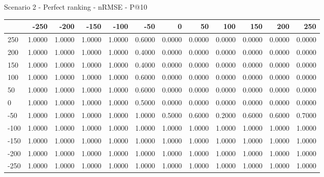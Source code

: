Scenario 2 - Perfect ranking - nRMSE - P@10
\begin{tabular}{lrrrrrrrrrrr}
\toprule
{} &   -250 &   -200 &   -150 &   -100 &   -50  &    0   &    50  &    100 &    150 &    200 &    250 \\
\midrule
 250 & 1.0000 & 1.0000 & 1.0000 & 1.0000 & 0.6000 & 0.0000 & 0.0000 & 0.0000 & 0.0000 & 0.0000 & 0.0000 \\
 200 & 1.0000 & 1.0000 & 1.0000 & 1.0000 & 0.4000 & 0.0000 & 0.0000 & 0.0000 & 0.0000 & 0.0000 & 0.0000 \\
 150 & 1.0000 & 1.0000 & 1.0000 & 1.0000 & 0.4000 & 0.0000 & 0.0000 & 0.0000 & 0.0000 & 0.0000 & 0.0000 \\
 100 & 1.0000 & 1.0000 & 1.0000 & 1.0000 & 0.6000 & 0.0000 & 0.0000 & 0.0000 & 0.0000 & 0.0000 & 0.0000 \\
 50  & 1.0000 & 1.0000 & 1.0000 & 1.0000 & 0.6000 & 0.0000 & 0.0000 & 0.0000 & 0.0000 & 0.0000 & 0.0000 \\
 0   & 1.0000 & 1.0000 & 1.0000 & 1.0000 & 0.5000 & 0.0000 & 0.0000 & 0.0000 & 0.0000 & 0.0000 & 0.0000 \\
-50  & 1.0000 & 1.0000 & 1.0000 & 1.0000 & 1.0000 & 0.5000 & 0.6000 & 0.2000 & 0.6000 & 0.6000 & 0.7000 \\
-100 & 1.0000 & 1.0000 & 1.0000 & 1.0000 & 1.0000 & 1.0000 & 1.0000 & 1.0000 & 1.0000 & 1.0000 & 1.0000 \\
-150 & 1.0000 & 1.0000 & 1.0000 & 1.0000 & 1.0000 & 1.0000 & 1.0000 & 1.0000 & 1.0000 & 1.0000 & 1.0000 \\
-200 & 1.0000 & 1.0000 & 1.0000 & 1.0000 & 1.0000 & 1.0000 & 1.0000 & 1.0000 & 1.0000 & 1.0000 & 1.0000 \\
-250 & 1.0000 & 1.0000 & 1.0000 & 1.0000 & 1.0000 & 1.0000 & 1.0000 & 1.0000 & 1.0000 & 1.0000 & 1.0000 \\
\bottomrule
\end{tabular}

